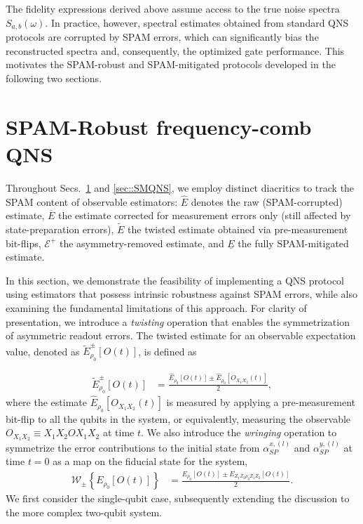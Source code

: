 \documentclass[%
 reprint,
superscriptaddress,
 amsmath,amssymb,
 aps,
pra,
floatfix,
]{revtex4-2}
\newcommand{\qk}[1]{{\color{OliveGreen}#1}}
\begin{document}
\qk{The fidelity expressions derived above assume access to the true noise spectra $S_{a,b}(\omega)$. In practice, however, spectral estimates obtained from standard QNS protocols are corrupted by SPAM errors, which can significantly bias the reconstructed spectra and, consequently, the optimized gate performance. This motivates the SPAM-robust and SPAM-mitigated protocols developed in the following two sections.}


\section{SPAM-Robust frequency-comb QNS}
\label{sec::SRQNS}

\qk{Throughout Secs.~\ref{sec::SRQNS} and \ref{sec::SMQNS}, we employ distinct diacritics to track the SPAM content of observable estimators: $\hat{E}$ denotes the raw (SPAM-corrupted) estimate, $\overline{E}$ the estimate corrected for measurement errors only (still affected by state-preparation errors), $\tilde{E}$ the twisted estimate obtained via pre-measurement bit-flips, $\mathcal{E}^+$ the asymmetry-removed estimate, and $\underline{E}$ the fully SPAM-mitigated estimate.}

In this section, we demonstrate the feasibility of implementing a QNS protocol using estimators that possess intrinsic robustness against SPAM errors, while also examining the fundamental limitations of this approach. For clarity of presentation, we introduce a \textit{twisting} operation that enables the symmetrization of asymmetric readout errors. The twisted estimate for an observable expectation value, denoted as $\tilde{E}_{\rho_0}^\pm[O(t)]$, is defined as

\begin{align}
    \tilde{E}^\pm_{\rho_0}[O(t)]&=\frac{\hat{E}_{\rho_0}[O(t)]\pm\hat{E}_{\rho_0}[O_{X_1X_2}(t)]}{2},
\end{align}
where the estimate $\hat{E}_{\rho_0}[O_{X_1X_2}(t)]$ is measured by applying a pre-measurement bit-flip to all the qubits in the system, or equivalently, measuring the observable $O_{X_1X_2}\equiv X_1X_2 OX_1X_2$ at time $t$. We also introduce the \textit{wringing} operation to symmetrize the error contributions to the initial state from $\alpha^{x,(l)}_{SP}$ and $\alpha^{y,(l)}_{SP}$ at time $t=0$ as a map on the fiducial state for the system,
\begin{align}
    \mathcal{W}_\pm\left\{E_{\rho_0}[O(t)]\right\}&=\frac{E_{\rho_0}[O(t)]\pm E_{Z_1Z_2\rho_0Z_1Z_2}[O(t)]}{2}.
\end{align}
We first consider the single-qubit case, subsequently extending the discussion to the more complex two-qubit system.
\end{document}
